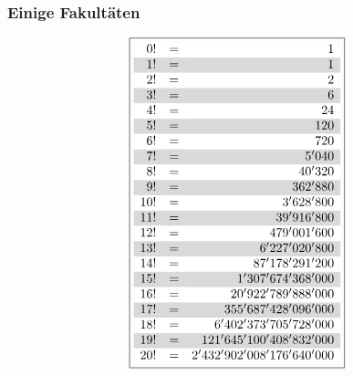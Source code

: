 \subsubsection{Einige Fakultäten}
\[ \boxed{\begin{array}{rcr}
\rowcolor{white}  0!&=&1\\
\rowcolor{lgray}  1!&=&1\\
\rowcolor{white}  2!&=&2\\
\rowcolor{lgray}  3!&=&6\\
\rowcolor{white}  4!&=&24\\
\rowcolor{lgray}  5!&=&120\\
\rowcolor{white}  6!&=&720\\
\rowcolor{lgray}  7!&=&5'040\\
\rowcolor{white}  8!&=&40'320\\
\rowcolor{lgray}  9!&=&362'880\\
\rowcolor{white} 10!&=&3'628'800\\
\rowcolor{lgray} 11!&=&39'916'800\\
\rowcolor{white} 12!&=&479'001'600\\
\rowcolor{lgray} 13!&=&6'227'020'800\\
\rowcolor{white} 14!&=&87'178'291'200\\
\rowcolor{lgray} 15!&=&1'307'674'368'000\\
\rowcolor{white} 16!&=&20'922'789'888'000\\
\rowcolor{lgray} 17!&=&355'687'428'096'000\\
\rowcolor{white} 18!&=&6'402'373'705'728'000\\
\rowcolor{lgray} 19!&=&121'645'100'408'832'000\\
\rowcolor{white} 20!&=&2'432'902'008'176'640'000\\
\end{array}}\]
